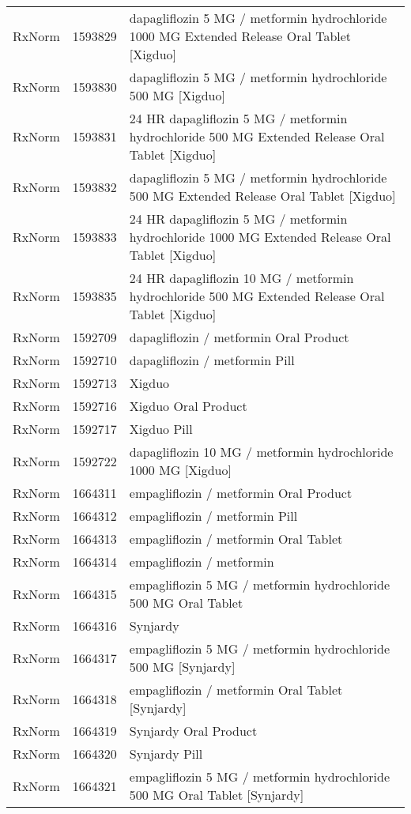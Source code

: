 \begin{longtable}{p{}p{}p{}}
  RxNorm & 1593829 & dapagliflozin 5 MG / metformin hydrochloride 1000 MG Extended Release Oral Tablet [Xigduo] \\ 
  RxNorm & 1593830 & dapagliflozin 5 MG / metformin hydrochloride 500 MG [Xigduo] \\ 
  RxNorm & 1593831 & 24 HR dapagliflozin 5 MG / metformin hydrochloride 500 MG Extended Release Oral Tablet [Xigduo] \\ 
  RxNorm & 1593832 & dapagliflozin 5 MG / metformin hydrochloride 500 MG Extended Release Oral Tablet [Xigduo] \\ 
  RxNorm & 1593833 & 24 HR dapagliflozin 5 MG / metformin hydrochloride 1000 MG Extended Release Oral Tablet [Xigduo] \\ 
  RxNorm & 1593835 & 24 HR dapagliflozin 10 MG / metformin hydrochloride 500 MG Extended Release Oral Tablet [Xigduo] \\ 
  RxNorm & 1592709 & dapagliflozin / metformin Oral Product \\ 
  RxNorm & 1592710 & dapagliflozin / metformin Pill \\ 
  RxNorm & 1592713 & Xigduo \\ 
  RxNorm & 1592716 & Xigduo Oral Product \\ 
  RxNorm & 1592717 & Xigduo Pill \\ 
  RxNorm & 1592722 & dapagliflozin 10 MG / metformin hydrochloride 1000 MG [Xigduo] \\ 
  RxNorm & 1664311 & empagliflozin / metformin Oral Product \\ 
  RxNorm & 1664312 & empagliflozin / metformin Pill \\ 
  RxNorm & 1664313 & empagliflozin / metformin Oral Tablet \\ 
  RxNorm & 1664314 & empagliflozin / metformin \\ 
  RxNorm & 1664315 & empagliflozin 5 MG / metformin hydrochloride 500 MG Oral Tablet \\ 
  RxNorm & 1664316 & Synjardy \\ 
  RxNorm & 1664317 & empagliflozin 5 MG / metformin hydrochloride 500 MG [Synjardy] \\ 
  RxNorm & 1664318 & empagliflozin / metformin Oral Tablet [Synjardy] \\ 
  RxNorm & 1664319 & Synjardy Oral Product \\ 
  RxNorm & 1664320 & Synjardy Pill \\ 
  RxNorm & 1664321 & empagliflozin 5 MG / metformin hydrochloride 500 MG Oral Tablet [Synjardy] \\ 

\end{longtable}

